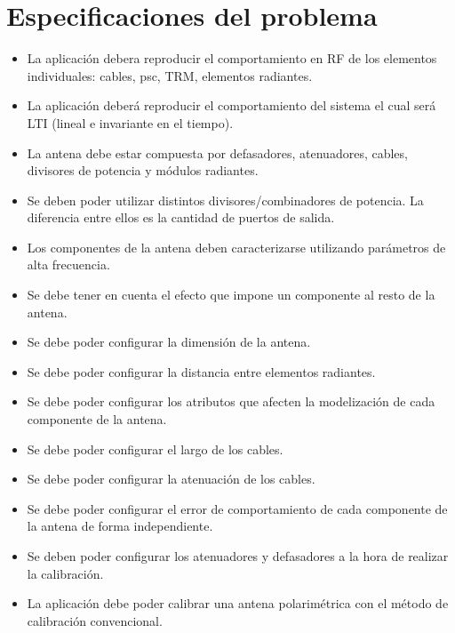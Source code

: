 \documentclass[a4paper,10pt]{article}
\begin{document}
\section{Especificaciones del problema}

\begin{itemize}
    \item La aplicación debera reproducir el comportamiento en RF de los 
elementos individuales: cables, psc, TRM, elementos radiantes.

    \item La aplicación deberá reproducir el comportamiento del sistema el cual 
será LTI (lineal e invariante en el tiempo).
    
    \item La antena debe estar compuesta por defasadores, atenuadores, cables, 
divisores de potencia y módulos radiantes.
    
    \item Se deben poder utilizar distintos divisores/combinadores de potencia. 
La diferencia entre ellos es la cantidad de puertos de salida.
    
    \item Los componentes de la antena deben caracterizarse utilizando 
parámetros de alta frecuencia.
    
    \item Se debe tener en cuenta el efecto que impone un componente al resto de
la antena.

    \item Se debe poder configurar la dimensión de la antena.
    \item Se debe poder configurar la distancia entre elementos radiantes.
    \item Se debe poder configurar los atributos que afecten la modelización de
cada componente de la antena. 
    
    \item Se debe poder configurar el largo de los cables.
    \item Se debe poder configurar la atenuación de los cables.
    
    \item Se debe poder configurar el error de comportamiento de cada
componente de la antena de forma independiente.

    \item Se deben poder configurar los atenuadores y defasadores a la hora de 
realizar la calibración. 

    \item La aplicación debe poder calibrar una antena polarimétrica con el 
método de calibración convencional.
    

\end{itemize}
\end{document}
